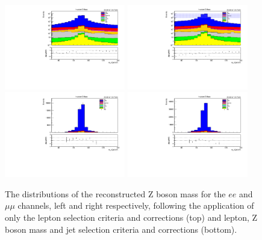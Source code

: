 \begin{figure}[tbp]
\centering
\includegraphics[width=0.47\textwidth]{figs/background-estimation/plots/unblinded/prompt_ee_ttbarInc/zPairMass_lepSel.pdf}
\includegraphics[width=0.47\textwidth]{figs/background-estimation/plots/unblinded/prompt_mumu_ttbarInc/zPairMass_lepSel.pdf}
\\
\includegraphics[width=0.47\textwidth]{figs/background-estimation/plots/unblinded/prompt_ee_ttbarInc/zPairMass_jetSel.pdf}
\includegraphics[width=0.47\textwidth]{figs/background-estimation/plots/unblinded/prompt_mumu_ttbarInc/zPairMass_jetSel.pdf}
\caption{
The distributions of the reconstructed Z boson mass for the $ee$ and $\mu\mu$ channels, left and right respectively, following the application of only the lepton selection criteria and corrections (top) and lepton, Z boson mass and jet selection criteria and corrections (bottom).
}
\label{fig:SR_zBoson}
\end{figure}

